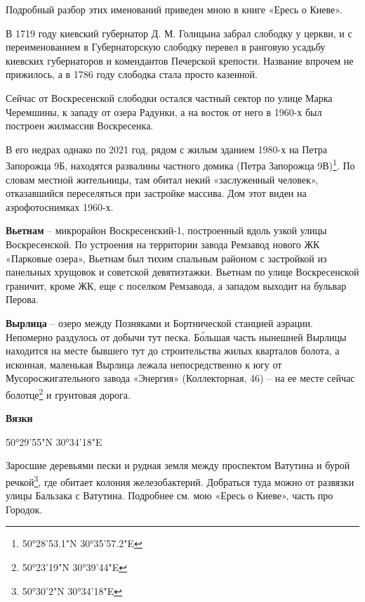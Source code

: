 Подробный разбор этих именований приведен мною в книге «Ересь о Киеве».

В 1719 году киевский губернатор Д. М. Голицына забрал слободку у церкви, и с переименованием в Губернаторскую слободку перевел в ранговую усадьбу киевских губернаторов и комендантов Печерской крепости. Название впрочем не прижилось, а в 1786 году слободка стала просто казенной.

Сейчас от Воскресенской слободки остался частный сектор по улице Марка Черемшины, к западу от озера Радунки, а на восток от него в 1960-х был построен жилмассив Воскресенка. 

В его недрах однако по 2021 год, рядом с жилым зданием 1980-х на Петра Запорожца 9Б, находятся развалины частного домика (Петра Запорожца 9В)\footnote{50°28'53.1"N 30°35'57.2"E}. По словам местной жительницы, там обитал некий «заслуженный человек», отказавшийся переселяться при застройке массива. Дом этот виден на аэрофотоснимках 1960-х.\\

\medskip


\textbf{Вьетнам} – микрорайон Воскресенский-1, построенный вдоль узкой улицы Воскресенской. По устроения на территории завода Ремзавод нового ЖК «Парковые озера», Вьетнам был тихим спальным районом с застройкой из панельных хрущовок и советской девятиэтажки. Вьетнам по улице Воскресенской граничит, кроме ЖК, еще с поселком Ремзавода, а западом выходит на бульвар Перова.\\

\medskip


\textbf{Вырлица} – озеро между Позняками и Бортнической станцией аэрации. Непомерно раздулось от добычи тут песка. Б\'ольшая часть нынешней Вырлицы находится на месте бывшего тут до строительства жилых кварталов болота, а исконная, маленькая Вырлица лежала непосредственно к югу от Мусоросжигательного завода «Энергия» (Коллекторная, 46) – на ее месте сейчас болотце\footnote{50°23'19"N 30°39'44"E} и грунтовая дорога.\\

\medskip


\textbf{Вязки}

50°29'55"N 30°34'18"E

Заросшие деревьями пески и рудная земля между проспектом Ватутина и бурой речкой\footnote{ 50°30'2"N 30°34'18"E}, где обитает колония железобактерий. Добраться туда можно от развязки улицы Бальзака с Ватутина. Подробнее см. мою «Ересь о Киеве», часть про Городок.
